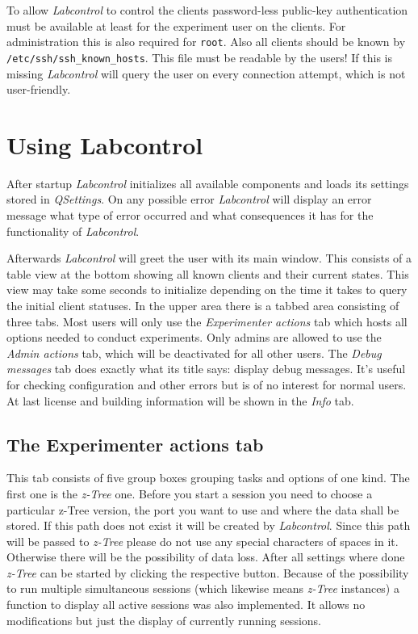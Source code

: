 \documentclass[a4paper,10pt]{article}
\begin{document}
To allow \emph{Labcontrol} to control the clients password-less public-key authentication must be available at least for the experiment user on the clients. For administration this is also required for \texttt{root}. Also all clients should be known by \texttt{ /etc/ssh/ssh\_known\_hosts}. This file must be readable by the users! If this is missing \emph{Labcontrol} will query the user on every connection attempt, which is not user-friendly.

\section{Using Labcontrol}

After startup \emph{Labcontrol} initializes all available components and loads its settings stored in \emph{QSettings}. On any possible error \emph{Labcontrol} will display an error message what type of error occurred and what consequences it has for the functionality of \emph{Labcontrol}.

Afterwards \emph{Labcontrol} will greet the user with its main window. This consists of a table view at the bottom showing all known clients and their current states. This view may take some seconds to initialize depending on the time it takes to query the initial client statuses. In the upper area there is a tabbed area consisting of three tabs. Most users will only use the \emph{Experimenter actions} tab which hosts all options needed to conduct experiments. Only admins are allowed to use the \emph{Admin actions} tab, which will be deactivated for all other users. The \emph{Debug messages} tab does exactly what its title says: display debug messages. It's useful for checking configuration and other errors but is of no interest for normal users. At last license and building information will be shown in the \emph{Info} tab.

\subsection{The Experimenter actions tab}

This tab consists of five group boxes grouping tasks and options of one kind. The first one is the \emph{z-Tree} one. Before you start a session you need to choose a particular z-Tree version, the port you want to use and where the data shall be stored. If this path does not exist it will be created by \emph{Labcontrol}. Since this path will be passed to \emph{z-Tree} please do not use any special characters of spaces in it. Otherwise there will be the possibility of data loss. After all settings where done \emph{z-Tree} can be started by clicking the respective button. Because of the possibility to run multiple simultaneous sessions (which likewise means \emph{z-Tree} instances) a function to display all active sessions was also implemented. It allows no modifications but just the display of currently running sessions.
\end{document}
